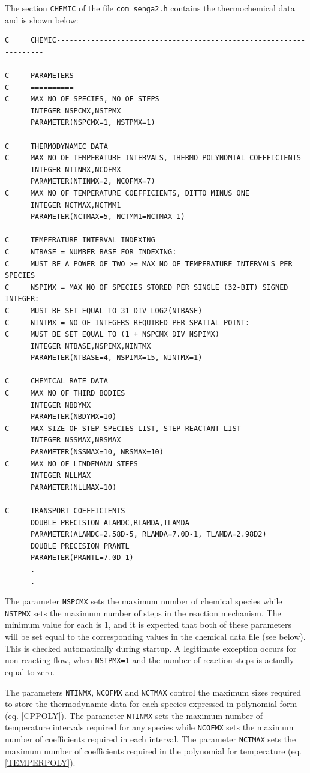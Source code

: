 \documentclass[dvips]{article}
\begin{document}
The section {\tt CHEMIC} of the file {\tt com\_senga2.h} contains the
thermochemical data and is shown below:
\begin{verbatim}
C     CHEMIC-------------------------------------------------------------------

C     PARAMETERS
C     ==========
C     MAX NO OF SPECIES, NO OF STEPS
      INTEGER NSPCMX,NSTPMX
      PARAMETER(NSPCMX=1, NSTPMX=1)

C     THERMODYNAMIC DATA
C     MAX NO OF TEMPERATURE INTERVALS, THERMO POLYNOMIAL COEFFICIENTS
      INTEGER NTINMX,NCOFMX
      PARAMETER(NTINMX=2, NCOFMX=7)
C     MAX NO OF TEMPERATURE COEFFICIENTS, DITTO MINUS ONE
      INTEGER NCTMAX,NCTMM1
      PARAMETER(NCTMAX=5, NCTMM1=NCTMAX-1)

C     TEMPERATURE INTERVAL INDEXING
C     NTBASE = NUMBER BASE FOR INDEXING:
C     MUST BE A POWER OF TWO >= MAX NO OF TEMPERATURE INTERVALS PER SPECIES
C     NSPIMX = MAX NO OF SPECIES STORED PER SINGLE (32-BIT) SIGNED INTEGER:
C     MUST BE SET EQUAL TO 31 DIV LOG2(NTBASE)
C     NINTMX = NO OF INTEGERS REQUIRED PER SPATIAL POINT:
C     MUST BE SET EQUAL TO (1 + NSPCMX DIV NSPIMX)
      INTEGER NTBASE,NSPIMX,NINTMX
      PARAMETER(NTBASE=4, NSPIMX=15, NINTMX=1)

C     CHEMICAL RATE DATA
C     MAX NO OF THIRD BODIES
      INTEGER NBDYMX
      PARAMETER(NBDYMX=10)
C     MAX SIZE OF STEP SPECIES-LIST, STEP REACTANT-LIST
      INTEGER NSSMAX,NRSMAX
      PARAMETER(NSSMAX=10, NRSMAX=10)
C     MAX NO OF LINDEMANN STEPS
      INTEGER NLLMAX
      PARAMETER(NLLMAX=10)

C     TRANSPORT COEFFICIENTS
      DOUBLE PRECISION ALAMDC,RLAMDA,TLAMDA
      PARAMETER(ALAMDC=2.58D-5, RLAMDA=7.0D-1, TLAMDA=2.98D2)
      DOUBLE PRECISION PRANTL
      PARAMETER(PRANTL=7.0D-1)
      .
      .
\end{verbatim}
The parameter {\tt NSPCMX} sets the maximum number of chemical species
while {\tt NSTPMX} sets the maximum number of steps in the reaction
mechanism.  The minimum value for each is 1, and it is expected that
both of these parameters will be set equal to the corresponding values
in the chemical data file (see below).  This is checked automatically
during startup.  A legitimate exception 
occurs for non-reacting flow, when {\tt NSTPMX=1} and the number of reaction
steps is actually equal to zero. 

The parameters {\tt NTINMX}, {\tt NCOFMX} and {\tt NCTMAX} control the
maximum sizes required to store the thermodynamic data for each species
expressed in polynomial form (eq. \ref{CPPOLY}).  The parameter {\tt NTINMX}
sets the maximum
number of temperature intervals required for any species while {\tt NCOFMX}
sets the maximum number of coefficients required in each interval.  The
parameter {\tt NCTMAX} sets the maximum number of
coefficients required in the polynomial for temperature (eq. \ref{TEMPERPOLY}).
\end{document}
